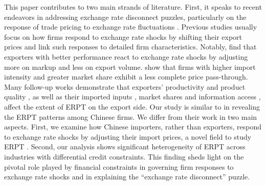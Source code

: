 This paper contributes to two main strands of literature. First, it speaks to recent endeavors in addressing exchange rate disconnect puzzles, particularly on the response of trade pricing to exchange rate fluctuations \citep{campa2005}. Previous studies usually focus on how firms respond to exchange rate shocks by shifting their export prices and link such responses to detailed firm characteristics. Notably, \cite{bmm2012} find that exporters with better performance react to exchange rate shocks by adjusting more on markup and less on export volume. \cite{aik2014} show that firms with higher import intensity and greater market share exhibit a less complete price pass-through. Many follow-up works demonstrate that exporters' productivity \citep{lmx2015} and product quality \citep{chen2016,auer2018}, as well as their imported inputs \citep{wang-yu2021}, market shares \citep{auer2016,devereux2017} and information access \citep{garetto2016}, affect the extent of ERPT on the export side. Our study is similar to \cite{lmx2015} in revealing the ERPT patterns among Chinese firms. We differ from their work in two main aspects. First, we examine how Chinese importers, rather than exporters, respond to exchange rate shocks by adjusting their import prices, a novel field to study ERPT \citep{apaitan2021heterogeneity, alviarez2023}. Second, our analysis shows significant heterogeneity of ERPT across industries with differential credit constraints. This finding sheds light on the pivotal role played by financial constraints in governing firm responses to exchange rate shocks and in explaining the ``exchange rate disconnect'' puzzle.   

